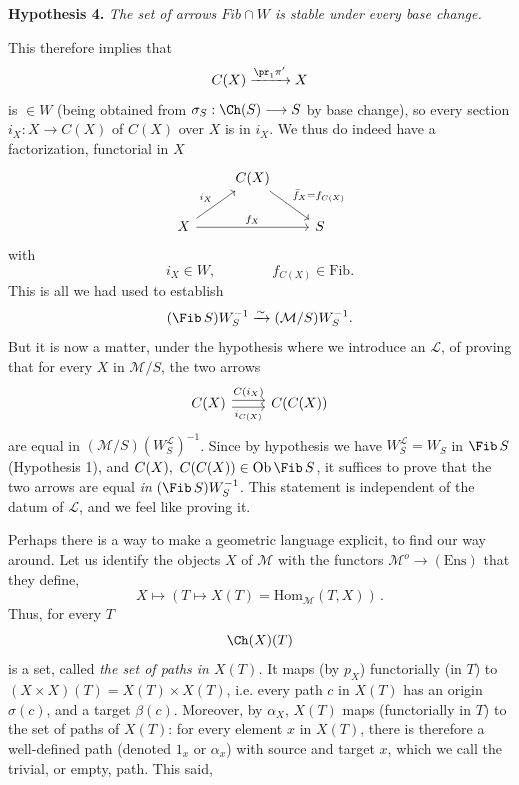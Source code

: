 \textbf{Hypothesis 4.} \textit{The set of arrows $\mathit{Fib}\cap W$ is stable under every base change.}



This therefore implies that
\[
C(X)\xrightarrow{\pr_1\pi'}X
\]
 is $\in W$ (being obtained from $\sigma_S : \Ch(S)\longrightarrow S$ by base change), so every section $i_X : X\longrightarrow C(X)$ of $C(X)$ over $X$ is in $i_X$. We thus do indeed have a factorization, functorial in $X$
\[
\begin{tikzcd}
 & C(X) \arrow[dr, "\bar f_X=f_{C(X)}"] & \\
X \arrow[ur, "i_X"] \arrow[rr, "f_X"] & & S
\end{tikzcd}
\]
with
\[
i_X\in W,\qquad\qquad f_{C(X)}\in\mathrm{Fib}.
\]
This is all we had used to establish
\[
(\Fib\,S)W_S^{-1}\xrightarrow{\sim}(\mathcal{M}/S)W_S^{-1}.
\]
But it is now a matter, under the hypothesis where we introduce an $\mathcal{L}$, of proving that for every $X$ in $\mathcal{M}/S$, the two arrows
\[
\begin{tikzcd}
C(X) \arrow[r, shift left, "C(i_X)"] \arrow[r, shift right, "i_{C(X)}"'] & C(C(X))
\end{tikzcd}
\]
are equal in $(\mathcal{M}/S)(W_S^{\mathcal{L}})^{-1}$. Since by hypothesis we have $W_S^{\mathcal{L}}=W_S$ in $\Fib\,S$ (Hypothesis 1), and $C(X),\ C(C(X))\in\mathrm{Ob}\,\Fib\,S$,
it suffices to prove that the two arrows are equal \textit{in} $(\Fib\,S)W_S^{-1}$. This statement is independent of the datum of $\mathcal{L}$, and we feel like proving it.

Perhaps there is a way to make a geometric language explicit, to find our way around. Let us identify the objects $X$ of $\mathcal{M}$ with the functors $\mathcal{M}^o\longrightarrow(\mathrm{Ens})$ that they define,
\[
X\longmapsto(T\longmapsto X(T)=\mathrm{Hom}_{\mathcal{M}}(T,X))\,.
\]
Thus, for every $T$ %
\[
\Ch(X)(T)
\]
is a set, called \textit{the set of paths in $X(T)$.} It maps (by $p_X$) functorially (in $T$) to $(X\times X)(T)=X(T)\times X(T)$, i.e. every path $c$ in $X(T)$ has an origin $\sigma(c)$, and a target $\beta(c)$. Moreover, by $\alpha_X$, $X(T)$ maps (functorially in $T$) to the set of paths of $X(T)$: for every element $x$ in $X(T)$, there is therefore a well-defined path (denoted $1_x$ or $\alpha_x$) with source and target $x$, which we call the trivial, or empty, path. This said,



